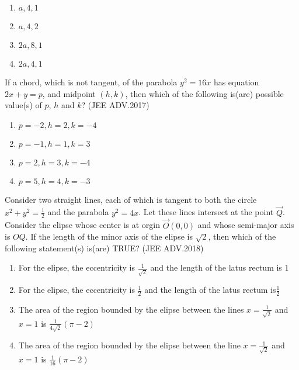 	       \begin{enumerate}
		      \item $a,4,1$
		      \item $a,4,2$
		      \item $2a,8,1$
		      \item $2a,4,1$
	       \end{enumerate}
      \item If a chord, which is not tangent, of the parabola $y^2=16x$ has equation $2x+y=p$, and midpoint $(h,k)$, then which of the following is(are) possible value(s) of $p$, $h$ and $k$? 
	      \hfill(JEE ADV.2017)
	      
	       \begin{enumerate}
		      \item $p=-2,h=2,k=-4$
		      \item $p=-1,h=1,k=3$
		      \item $p=2,h=3,k=-4$
		      \item $p=5,h=4,k=-3$


	       \end{enumerate}
      \item Consider two straight lines, each of which is tangent to both the circle $x^2+y^2=\frac{1}{2}$
	      and the parabola $y^2=4x$. Let these lines intersect at the point $\vec{Q}$. Consider the elipse whose center is at orgin $\vec{O}(0,0)$ and whose semi-major axis is $OQ$.
	      If the length of the minor axis of the elipse is $\sqrt{2}$, then which of the following statement(s) is(are) TRUE? 
	      \hfill(JEE ADV.2018)
	      
	       \begin{enumerate}
		      \item For the elipse, the eccentricity is $\frac{1}{\sqrt{2}}$ and the length of the latus rectum is $1$

		      \item For the elipse, the eccentricity is $\frac{1}{2}$ and the length of the latus rectum is$\frac{1}{2}$
		      \item The area of the region bounded by the elipse between the lines $x=\frac{1}{\sqrt{2}}$ and $x=1$ is $\frac{1}{4\sqrt{2}}(\pi-2)$
		      \item The area of the region bounded by the elipse between the line $x=\frac{1}{\sqrt{2}}$ and $x=1$ is $\frac{1}{16}(\pi-2)$
	       \end{enumerate}




